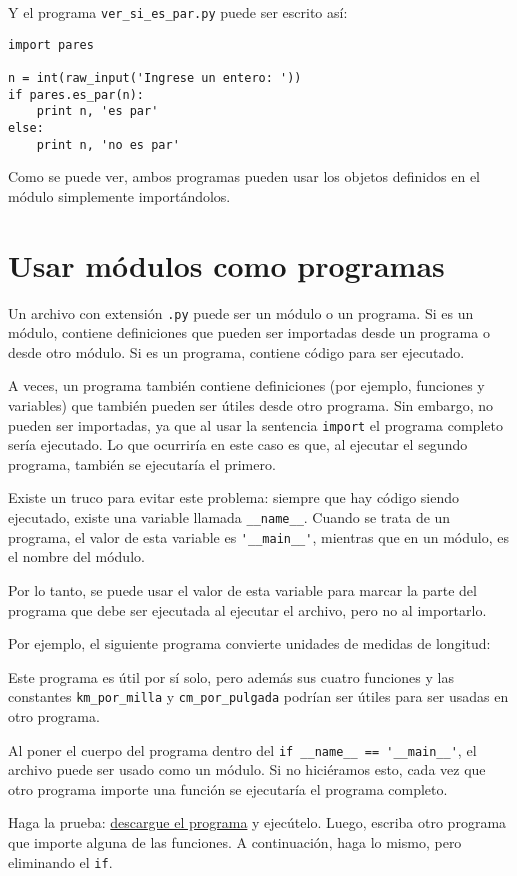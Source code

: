 Y el programa \lstinline!ver_si_es_par.py! puede ser escrito así:

\begin{lstlisting}
import pares

n = int(raw_input('Ingrese un entero: '))
if pares.es_par(n):
    print n, 'es par'
else:
    print n, 'no es par'
\end{lstlisting}

Como se puede ver, ambos programas pueden usar los objetos definidos en
el módulo simplemente importándolos.

\section{Usar módulos como programas}

Un archivo con extensión \lstinline!.py! puede ser un módulo o un
programa. Si es un módulo, contiene definiciones que pueden ser
importadas desde un programa o desde otro módulo. Si es un programa,
contiene código para ser ejecutado.

A veces, un programa también contiene definiciones (por ejemplo,
funciones y variables) que también pueden ser útiles desde otro
programa. Sin embargo, no pueden ser importadas, ya que al usar la
sentencia \lstinline!import! el programa completo sería ejecutado. Lo
que ocurriría en este caso es que, al ejecutar el segundo programa,
también se ejecutaría el primero.

Existe un truco para evitar este problema: siempre que hay código siendo
ejecutado, existe una variable llamada \lstinline!__name__!. Cuando se
trata de un programa, el valor de esta variable es
\lstinline!'__main__'!, mientras que en un módulo, es el nombre del
módulo.

Por lo tanto, se puede usar el valor de esta variable para marcar la
parte del programa que debe ser ejecutada al ejecutar el archivo, pero
no al importarlo.

Por ejemplo, el siguiente programa convierte unidades de medidas de
longitud:

Este programa es útil por sí solo, pero además sus cuatro funciones y
las constantes \lstinline!km_por_milla! y \lstinline!cm_por_pulgada!
podrían ser útiles para ser usadas en otro programa.

Al poner el cuerpo del programa dentro del
\lstinline!if __name__ == '__main__'!, el archivo puede ser usado como
un módulo. Si no hiciéramos esto, cada vez que otro programa importe una
función se ejecutaría el programa completo.

Haga la prueba:
\href{../\_static/programas/conversion\_unidades.py}{descargue el
programa} y ejecútelo. Luego, escriba otro programa que importe alguna
de las funciones. A continuación, haga lo mismo, pero eliminando el
\lstinline!if!.
